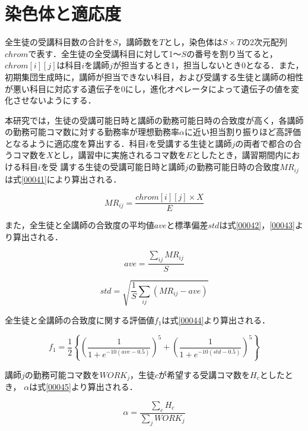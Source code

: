 \section{染色体と適応度}
全生徒の受講科目数の合計を$S$，講師数を$T$とし，染色体は$S×T$の2次元配列$chrom$で表す．全生徒の全受講科目に対して1〜$S$の番号を割り当てると，$chrom[i][j]$は科目$i$を講師$j$が担当するとき1，担当しないとき0となる．また，初期集団生成時に，講師が担当できない科目，および受講する生徒と講師の相性が悪い科目に対応する遺伝子を0にし，進化オペレータによって遺伝子の値を変化させないようにする．

本研究では，生徒の受講可能日時と講師の勤務可能日時の合致度が高く，各講師の勤務可能コマ数に対する勤務率が理想勤務率$\alpha$に近い担当割り振りほど高評価となるように適応度を算出する．科目$i$を受講する生徒と講師$j$の両者で都合の合うコマ数を$X$とし，講習中に実施されるコマ数を$E$としたとき，講習期間内における科目$i$を受
講する生徒の受講可能日時と講師$j$の勤務可能日時の合致度$MR_{ij}$は式\ref{00041}により算出される．

\begin{equation}
  \label{00041}
  MR_{ij}=\frac{chrom[i][j]×X}{E}
\end{equation}

また，全生徒と全講師の合致度の平均値$ave$と標準偏差$std$は式\ref{00042}，\ref{00043}より算出される．

\begin{equation}
  \label{00042}
  ave=\frac{\sum_{ij}MR_{ij}}{S}
\end{equation}

\begin{equation}
  \label{00043}
  std=\sqrt{ \frac{1}{S} \sum_{ij}\left(MR_{ij}-ave\right) }
\end{equation}

全生徒と全講師の合致度に関する評価値$f_{1}$は式\ref{00044}より算出される．

\begin{equation}
  \label{00044}
  f_{1}=\frac{1}{2}\left\{\left(\frac{1}{1+e^{-10(ave-0.5)}}\right)^5+\left(\frac{1}{1+e^{-10(std-0.5)}}\right)^5\right\}
\end{equation}

講師$j$の勤務可能コマ数を$WORK_{j}$，生徒$c$が希望する受講コマ数を$H_{c}$としたとき， $\alpha$は式\ref{00045}より算出される．

\begin{equation}
  \label{00045}
  \alpha =\frac{\sum_{c}H_{c}}{\sum_{j}WORK_{j}}
\end{equation}

